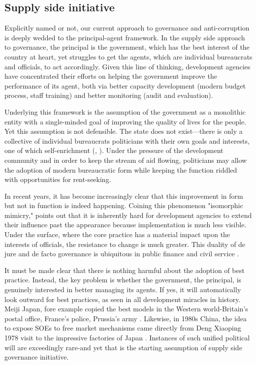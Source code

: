\documentclass[12pt]{article}
\begin{document}
\subsection{Supply side initiative}
\label{sec:supplyside}
Explicitly named or not, our current approach to governance and anti-corruption is deeply wedded to the principal-agent framework. In the supply side approach to governance, the principal is the government, which has the best interest of the country at heart, yet struggles to get the agents, which are individual bureaucrats and officials, to act accordingly. Given this line of thinking, development agencies have concentrated their efforts on helping the government improve the performance of its agent, both via better capacity development (modern budget process, staff training) and better monitoring  (audit and evaluation).

Underlying this framework is the assumption of the government as a monolithic entity with a single-minded goal of improving the quality of lives for the people. Yet this assumption is not defensible. The state does not exist---there is only a collective of individual bureaucrats politicians with their own goals and interests, one of which self-enrichment (\citealp{Booth2012}, \citealp{Shleifer2002}). Under the pressure of the development community and in order to keep the stream of aid flowing, politicians may allow the adoption of modern bureaucratic form while keeping the function riddled with opportunities for rent-seeking.

In recent years, it has become increasingly clear that this improvement in form but not in function is indeed happening.  Coining this phenomenon "isomorphic mimicry," \citet{Andrews2010} points out that it is inherently hard for development agencies to extend their influence past the appearance because implementation is much less visible. Under the surface, where the core practice has a material impact upon the interests of officials, the resistance to change is much greater. This duality of de jure and de facto governance is ubiquitous in public finance and civil service \citep[8-9]{Andrews2009}.

It must be made clear that there is nothing harmful about the adoption of best practice. Instead, the key problem is whether the government, the principal, is genuinely interested in better managing its agents. If yes, it will automatically look outward for best practices, as seen in all development miracles in history. Meiji Japan, fore example copied the best models in the Western world-Britain's postal office, France's police, Prussia's army \citep{Krause2013}. Likewise, in 1980s China, the idea to expose SOEs to free market mechanisms came directly from Deng Xiaoping 1978 visit to the impressive factories of Japan \citep{Coase2012}. Instances of such unified political will are exceedingly rare-and yet that is the starting assumption of supply side governance initiative.
\end{document}
